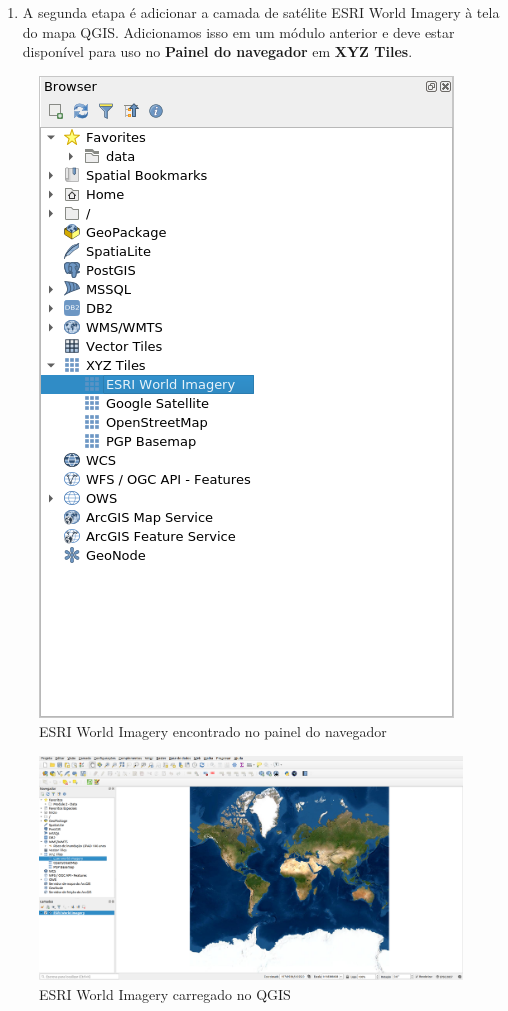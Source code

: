 \documentclass[
]{book}
\providecommand{\tightlist}{%
  \setlength{\itemsep}{0pt}\setlength{\parskip}{0pt}}
\begin{document}
\begin{enumerate}
\def\labelenumi{\arabic{enumi}.}
\setcounter{enumi}{3}
\tightlist
\item
  A segunda etapa é adicionar a camada de satélite ESRI World Imagery à tela do mapa QGIS. Adicionamos isso em um módulo anterior e deve estar disponível para uso no \textbf{Painel do navegador} em \textbf{XYZ Tiles}.
\end{enumerate}

\begin{figure}
\centering
\includegraphics{media/modulo7/xyz-2.png}
\caption{ESRI World Imagery encontrado no painel do navegador}
\end{figure}

\begin{figure}
\centering
\includegraphics{media/modulo7/xyz-3.png}
\caption{ESRI World Imagery carregado no QGIS}
\end{figure}
\end{document}
